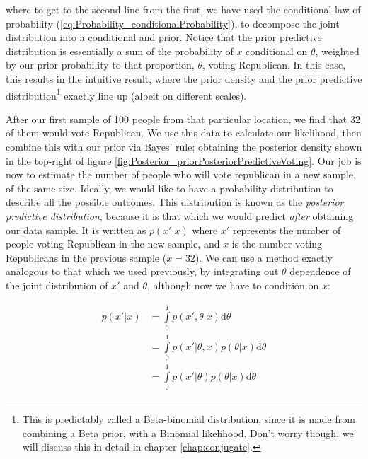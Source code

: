 \documentclass[11pt,fullpage]{book}
\begin{document}
where to get to the second line from the first, we have used the conditional law of probability (\ref{eq:Probability_conditionalProbability}), to decompose the joint distribution into a conditional and prior. Notice that the prior predictive distribution is essentially a sum of the probability of $x$ conditional on $\theta$, weighted by our prior probability to that proportion, $\theta$, voting Republican. In this case, this results in the intuitive result, where the prior density and the prior predictive distribution\footnote{This is predictably called a Beta-binomial distribution, since it is made from combining a Beta prior, with a Binomial likelihood. Don't worry though, we will discuss this in detail in chapter \ref{chap:conjugate}.} exactly line up (albeit on different scales).

After our first sample of 100 people from that particular location, we find that 32 of them would vote Republican. We use this data to calculate our likelihood, then combine this with our prior via Bayes' rule; obtaining the posterior density shown in the top-right of figure \ref{fig:Posterior_priorPosteriorPredictiveVoting}. Our job is now to estimate the number of people who will vote republican in a new sample, of the same size. Ideally, we would like to have a probability distribution to describe all the possible outcomes. This distribution is known as the \textit{posterior predictive distribution}, because it is that which we would predict \textit{after} obtaining our data sample. It is written as $p(x'|x)$ where $x'$ represents the number of people voting Republican in the new sample, and $x$ is the number voting Republicans in the previous sample ($x=32$). We can use a method exactly analogous to that which we used previously, by integrating out $\theta$ dependence of the joint distribution of $x'$ and $\theta$, although now we have to condition on $x$:

\begin{align}\label{eq:Posterior_posteriorPredictiveVoting}
p(x'|x) &= \int\limits_{0}^{1} p(x',\theta|x) \mathrm{d}\theta\\
&= \int\limits_{0}^{1} p(x'|\theta,x) p(\theta|x) \mathrm{d}\theta\\
&= \int\limits_{0}^{1} p(x'|\theta) p(\theta|x) \mathrm{d}\theta
\end{align}
\end{document}
